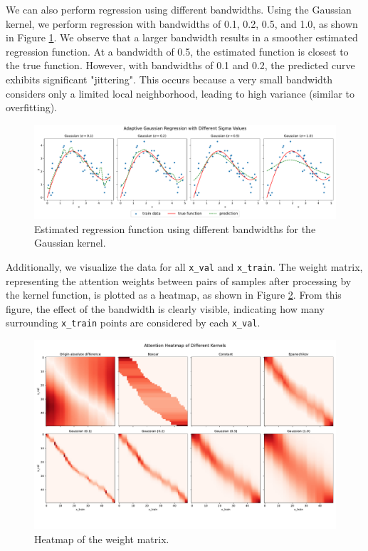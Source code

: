 \documentclass{article}
\begin{document}
We can also perform regression using different bandwidths. Using the Gaussian kernel, we perform regression with bandwidths of 0.1, 0.2, 0.5, and 1.0, as shown in Figure \ref{fig:adaptive_gaussian}. We observe that a larger bandwidth results in a smoother estimated regression function. At a bandwidth of 0.5, the estimated function is closest to the true function. However, with bandwidths of 0.1 and 0.2, the predicted curve exhibits significant "jittering". This occurs because a very small bandwidth considers only a limited local neighborhood, leading to high variance (similar to overfitting).

\begin{figure}[H]
    \centering
    \includegraphics[width=\textwidth]{results/adaptive_gaussian_regression.pdf}
    \caption{Estimated regression function using different bandwidths for the Gaussian kernel.}
    \label{fig:adaptive_gaussian}
\end{figure}

Additionally, we visualize the data for all \texttt{x\_val} and \texttt{x\_train}. The weight matrix, representing the attention weights between pairs of samples after processing by the kernel function, is plotted as a heatmap, as shown in Figure \ref{fig:attention_heatmap}. From this figure, the effect of the bandwidth is clearly visible, indicating how many surrounding \texttt{x\_train} points are considered by each \texttt{x\_val}.

\begin{figure}[H]
    \centering
    \includegraphics[width=\textwidth]{results/attention_heatmap.pdf}
    \caption{Heatmap of the weight matrix.}
    \label{fig:attention_heatmap}
\end{figure}



\end{document}
